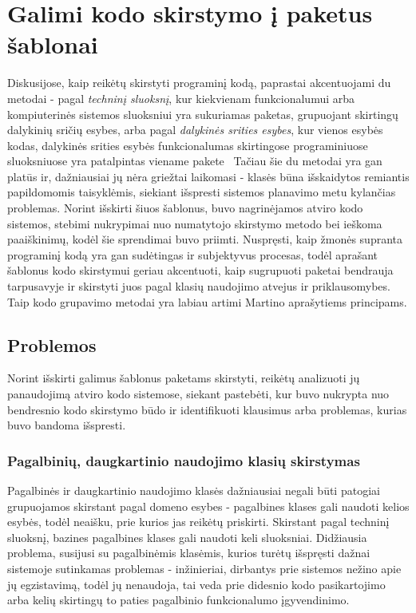 \section{Galimi kodo skirstymo į paketus šablonai}
Diskusijose, kaip reikėtų skirstyti programinį kodą, paprastai akcentuojami du metodai - pagal \textit{techninį sluoksnį},
kur kiekvienam funkcionalumui arba kompiuterinės sistemos sluoksniui yra sukuriamas paketas,
grupuojant skirtingų dalykinių sričių esybes, arba pagal \textit{dalykinės srities esybes}, kur vienos esybės kodas, dalykinės srities
esybės funkcionalumas skirtingose programiniuose sluoksniuose yra patalpintas viename pakete~\cite{PackagingWays}
Tačiau šie du metodai yra gan platūs ir, dažniausiai jų nėra griežtai laikomasi - klasės būna išskaidytos remiantis papildomomis taisyklėmis,
siekiant išspresti sistemos planavimo metu kylančias problemas. Norint išskirti šiuos šablonus, buvo nagrinėjamos atviro kodo sistemos,
stebimi nukrypimai nuo numatytojo skirstymo metodo bei ieškoma paaiškinimų, kodėl šie sprendimai buvo priimti.
Nuspręsti, kaip žmonės supranta programinį kodą yra gan sudėtingas ir subjektyvus procesas, todėl aprašant šablonus kodo skirstymui
geriau akcentuoti, kaip sugrupuoti paketai bendrauja tarpusavyje ir skirstyti juos pagal klasių naudojimo atvejus ir priklausomybes.
Taip kodo grupavimo metodai yra labiau artimi Martino aprašytiems principams.

\subsection{Problemos}
Norint išskirti galimus šablonus paketams skirstyti, reikėtų
analizuoti jų panaudojimą atviro kodo sistemose, siekant pastebėti, kur buvo nukrypta nuo bendresnio kodo skirstymo
būdo ir identifikuoti klausimus arba problemas, kurias buvo bandoma išspresti.


\subsubsection{Pagalbinių, daugkartinio naudojimo klasių skirstymas}
Pagalbinės ir daugkartinio naudojimo klasės dažniausiai negali būti patogiai grupuojamos skirstant pagal domeno esybes - pagalbines klases gali
naudoti kelios esybės, todėl neaišku, prie kurios jas reikėtų priskirti. Skirstant pagal techninį sluoksnį, bazines pagalbines klases gali naudoti keli
sluoksniai.
Didžiausia problema, susijusi su pagalbinėmis klasėmis, kurios turėtų išspręsti dažnai sistemoje sutinkamas problemas -
inžinieriai, dirbantys prie sistemos nežino apie jų egzistavimą, todėl jų nenaudoja,
tai veda prie didesnio kodo pasikartojimo arba kelių skirtingų to paties pagalbinio funkcionalumo įgyvendinimo.

